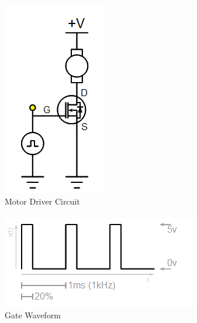 \documentclass{beamer}
\begin{document}
\begin{frame}
\begin{columns}[t]
\begin{figure}
  \centering
  \includegraphics[scale=0.33]{images-dis3/driverckt-lowside} \\
  Motor Driver Circuit \\
  \hfill \\
  \includegraphics[width=1.0\columnwidth]{images-dis3/driverwave-demo} \\
  Gate Waveform
\end{figure}
\end{columns}
\end{frame}
\end{document}
